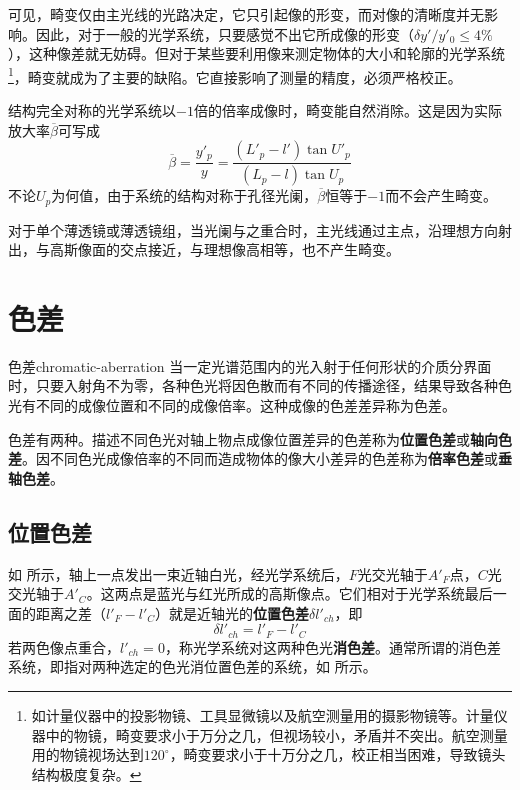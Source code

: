 可见，畸变仅由主光线的光路决定，它只引起像的形变，而对像的清晰度并无影响。因此，对于一般的光学系统，只要感觉不出它所成像的形变（$\delta y'/y'_0\leqslant 4\%$），这种像差就无妨碍。但对于某些要利用像来测定物体的大小和轮廓的光学系统\footnote{如计量仪器中的投影物镜、工具显微镜以及航空测量用的摄影物镜等。计量仪器中的物镜，畸变要求小于万分之几，但视场较小，矛盾并不突出。航空测量用的物镜视场达到$120^{\circ}$，畸变要求小于十万分之几，校正相当困难，导致镜头结构极度复杂。}，畸变就成为了主要的缺陷。它直接影响了测量的精度，必须严格校正。

结构完全对称的光学系统以$-1$倍的倍率成像时，畸变能自然消除。这是因为实际放大率$\overline{\beta}$可写成
\begin{equation}
\overline{\beta}=\frac{y'_p}{y}=\frac{(L'_p-l')\tan U'_p}{(L_p-l)\tan U_p}
\end{equation}
不论$U_p$为何值，由于系统的结构对称于孔径光阑，$\overline{\beta}$恒等于$-1$而不会产生畸变。

对于单个薄透镜或薄透镜组，当光阑与之重合时，主光线通过主点，沿理想方向射出，与高斯像面的交点接近，与理想像高相等，也不产生畸变。


\section{色差}
\label{sect:chromatic-aberration}
\begin{definition}{色差}{chromatic-aberration}
	当一定光谱范围内的光入射于任何形状的介质分界面时，只要入射角不为零，各种色光将因色散而有不同的传播途径，结果导致各种色光有不同的成像位置和不同的成像倍率。这种成像的色差差异称为色差。
\end{definition}

色差有两种。描述不同色光对轴上物点成像位置差异的色差称为\textbf{位置色差}或\textbf{轴向色差}。因不同色光成像倍率的不同而造成物体的像大小差异的色差称为\textbf{倍率色差}或\textbf{垂轴色差}。

\subsection{位置色差}

如 所示，轴上一点发出一束近轴白光，经光学系统后，$F$光交光轴于$A'_F$点，$C$光交光轴于$A'_C$。这两点是蓝光与红光所成的高斯像点。它们相对于光学系统最后一面的距离之差（$l'_F-l'_C$）就是近轴光的\textbf{位置色差}$\delta l'_{ch}$，即
\begin{equation}
\delta l'_{ch}=l'_F-l'_C
\end{equation}
若两色像点重合，$l'_{ch}=0$，称光学系统对这两种色光\textbf{消色差}。通常所谓的消色差系统，即指对两种选定的色光消位置色差的系统，如 所示。

